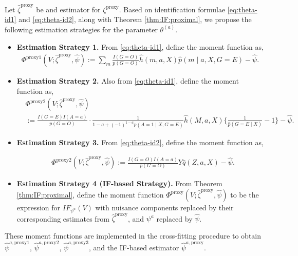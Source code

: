 \documentclass[10pt]{article}
\begin{document}
Let $\hat\zeta^{\text{proxy}}$ be and estimator for $\zeta^{\text{proxy}}$. Based on identification formulae \eqref{eq:theta-id1} and \eqref{eq:theta-id2}, along with Theorem \ref{thm:IF:proximal}, we propose the following estimation strategies for the parameter $\theta^{(a)}$.

\begin{itemize}
	
\item{\bf Estimation Strategy 1.} From \eqref{eq:theta-id1}, define the moment function as,
\begin{align*}
\Phi^{\text{proxy1}}(V;\hat{\zeta}^{\text{proxy}},\hat\psi):= \sum_m\frac{I(G=O)}{p(G=O)}\hat{h}(m,a,X)\hat{p}(m\mid a,X,G=E)-\hat\psi.
\end{align*}

\item{\bf Estimation Strategy 2.} Also from \eqref{eq:theta-id1}, define the moment function as,
\begin{align*}
&\Phi^{\text{proxy2}}(V;\hat{\zeta}^{\text{proxy}},\hat\psi)\\
&:=\frac{I(G=E)I(A=a)}{p(G=O)}\cdot\frac{1}{1-a+(-1)^{1-a}\hat{p}(A=1\mid X,G=E)}
\hat{h}(M,a,X)\{\frac{1}{\hat{p}(G=E\mid X)}-1\}
-\hat\psi.
\end{align*}

\item{\bf Estimation Strategy 3.} From \eqref{eq:theta-id2}, define the moment function as,

\begin{align*}
&\Phi^{\text{proxy2}}(V;\hat{\zeta}^{\text{proxy}},\hat\psi):=\frac{I(G=O)I(A=a)}{p(G=O)}Y\hat{q}(Z,a,X)-\hat\psi.
\end{align*}

\item{\bf Estimation Strategy 4 (IF-based Strategy).} From Theorem \ref{thm:IF:proximal}, define the moment function $\Phi^{\text{proxy}}(V; \hat\zeta^{\text{proxy}}, \hat\psi)$ to be the expression for $IF_{\psi^a}(V)$ with nuisance components replaced by their corresponding estimates from $\hat\zeta^{\text{proxy}}$, and $\psi^a$ replaced by $\hat\psi$.

\end{itemize}

These moment functions are implemented in the cross-fitting procedure to obtain $\hat\psi^{a,\text{proxy1}}$, $\hat\psi^{a,\text{proxy2}}$, $\hat\psi^{a,\text{proxy3}}$, and the IF-based estimator $\hat\psi^{a,\text{proxy}}$.
\end{document}

